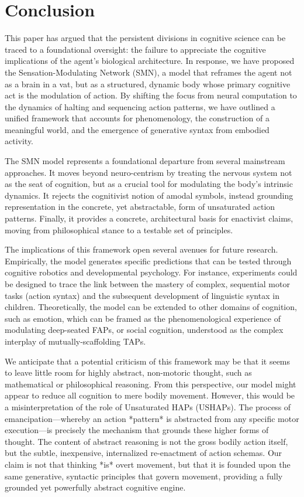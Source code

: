 \section{Conclusion}
\label{sec:conclusion}
This paper has argued that the persistent divisions in cognitive science can be traced to a foundational oversight: the failure to appreciate the cognitive implications of the agent's biological architecture. In response, we have proposed the Sensation-Modulating Network (SMN), a model that reframes the agent not as a brain in a vat, but as a structured, dynamic body whose primary cognitive act is the modulation of action. By shifting the focus from neural computation to the dynamics of halting and sequencing action patterns, we have outlined a unified framework that accounts for phenomenology, the construction of a meaningful world, and the emergence of generative syntax from embodied activity.

The SMN model represents a foundational departure from several mainstream approaches. It moves beyond neuro-centrism by treating the nervous system not as the seat of cognition, but as a crucial tool for modulating the body's intrinsic dynamics. It rejects the cognitivist notion of amodal symbols, instead grounding representation in the concrete, yet abstractable, form of unsaturated action patterns. Finally, it provides a concrete, architectural basis for enactivist claims, moving from philosophical stance to a testable set of principles.

The implications of this framework open several avenues for future research. Empirically, the model generates specific predictions that can be tested through cognitive robotics and developmental psychology. For instance, experiments could be designed to trace the link between the mastery of complex, sequential motor tasks (action syntax) and the subsequent development of linguistic syntax in children. Theoretically, the model can be extended to other domains of cognition, such as emotion, which can be framed as the phenomenological experience of modulating deep-seated FAPs, or social cognition, understood as the complex interplay of mutually-scaffolding TAPs.

We anticipate that a potential criticism of this framework may be that it seems to leave little room for highly abstract, non-motoric thought, such as mathematical or philosophical reasoning. From this perspective, our model might appear to reduce all cognition to mere bodily movement. However, this would be a misinterpretation of the role of Unsaturated HAPs (USHAPs). The process of emancipation—whereby an action *pattern* is abstracted from any specific motor execution—is precisely the mechanism that grounds these higher forms of thought. The content of abstract reasoning is not the gross bodily action itself, but the subtle, inexpensive, internalized re-enactment of action schemas. Our claim is not that thinking *is* overt movement, but that it is founded upon the same generative, syntactic principles that govern movement, providing a fully grounded yet powerfully abstract cognitive engine.


